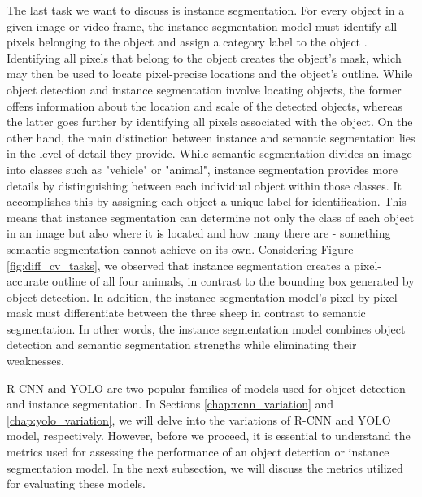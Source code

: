 The last task we want to discuss is instance segmentation. For every object in a given image or video frame, the instance segmentation model must identify all pixels belonging to the object and assign a category label to the object \cite{overview_cv_task}. Identifying all pixels that belong to the object creates the object's mask, which may then be used to locate pixel-precise locations and the object's outline. While object detection and instance segmentation involve locating objects, the former offers information about the location and scale of the detected objects, whereas the latter goes further by identifying all pixels associated with the object. On the other hand, the main distinction between instance and semantic segmentation lies in the level of detail they provide. While semantic segmentation divides an image into classes such as "vehicle" or "animal", instance segmentation provides more details by distinguishing between each individual object within those classes. It accomplishes this by assigning each object a unique label for identification. This means that instance segmentation can determine not only the class of each object in an image but also where it is located and how many there are - something semantic segmentation cannot achieve on its own. Considering Figure \ref{fig:diff_cv_tasks}, we observed that instance segmentation creates a pixel-accurate outline of all four animals, in contrast to the bounding box generated by object detection. In addition, the instance segmentation model's pixel-by-pixel mask must differentiate between the three sheep in contrast to semantic segmentation. In other words, the instance segmentation model combines object detection and semantic segmentation strengths while eliminating their weaknesses.
 
R-CNN and YOLO are two popular families of models used for object detection and instance segmentation. In Sections \ref{chap:rcnn_variation} and \ref{chap:yolo_variation}, we will delve into the variations of R-CNN and YOLO model, respectively. However, before we proceed, it is essential to understand the metrics used for assessing the performance of an object detection or instance segmentation model. In the next subsection, we will discuss the metrics utilized for evaluating these models.